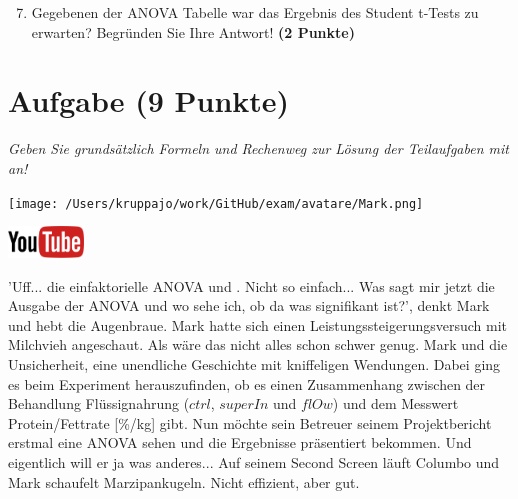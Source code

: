 \documentclass[a4paper, 9pt]{scrartcl}\usepackage[]{graphicx}\usepackage[]{xcolor}
\begin{document}
\begin{enumerate}
  \setcounter{enumi}{6}
\item Gegebenen der ANOVA Tabelle war das Ergebnis des Student t-Tests zu erwarten? Begründen Sie Ihre Antwort! \textbf{(2 Punkte)}
\end{enumerate}

 
\clearpage

\section{Aufgabe \hfill (9 Punkte)}

\textit{Geben Sie grundsätzlich Formeln und Rechenweg zur Lösung der Teilaufgaben mit an!} \\[1Ex]
 

 
\begin{minipage}[t]{0.5\textwidth}
\texttt{[image: /Users/kruppajo/work/GitHub/exam/avatare/Mark.png]}
\end{minipage}
\begin{minipage}[t]{0.5\textwidth}
\hfill
\href{https://youtu.be/aXvxGC4YLqk}{\includegraphics[width = 2cm]{img/youtube}}\\[1Ex]
\end{minipage}
\vspace{1ex}



'Uff... die einfaktorielle ANOVA und \Rlogo. Nicht so einfach... Was sagt mir jetzt die Ausgabe der ANOVA und wo sehe ich, ob da was signifikant ist?', denkt Mark und hebt die Augenbraue. Mark hatte sich einen Leistungssteigerungsversuch mit Milchvieh angeschaut. Als wäre das nicht alles schon schwer genug. Mark und die Unsicherheit, eine unendliche Geschichte mit kniffeligen Wendungen. Dabei ging es beim Experiment herauszufinden, ob es einen Zusammenhang zwischen der Behandlung Flüssignahrung ($ctrl$, $superIn$ und $flOw$) und dem Messwert Protein/Fettrate [\%/kg] gibt. Nun möchte sein Betreuer seinem Projektbericht erstmal eine ANOVA sehen und die Ergebnisse präsentiert bekommen. Und eigentlich will er ja was anderes... Auf seinem Second Screen läuft Columbo und Mark schaufelt Marzipankugeln. Nicht effizient, aber gut.
\end{document}
